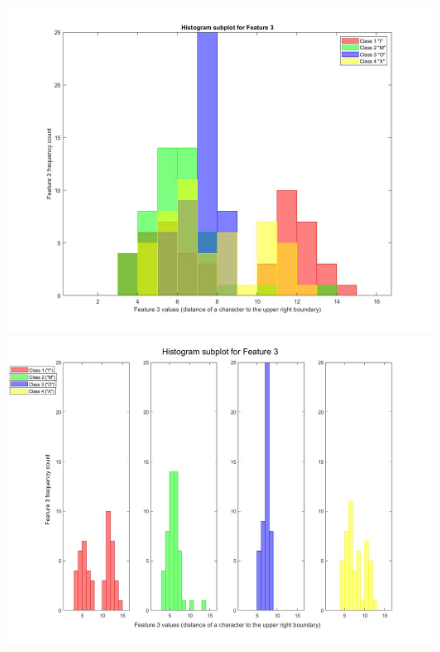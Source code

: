 \documentclass[a4paper,12pt]{article}
\begin{document}
\begin{figure}[H]
\centering
\includegraphics[scale=0.3]{q1pc_3.jpg}
\includegraphics[scale=0.3]{q1pcs_3.jpg}
\end{figure}
\pagebreak
\end{document}
